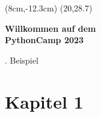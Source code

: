\documentclass[a4paper]{article}
\title{}
\author{}
\date{2023-06-24}
\newcommand{\name}{PythonCamp 2023}
\newcommand{\BeispielCommand}{2. Beispiel}
\begin{document}
	\fancyput(8cm,-12.3cm){%
		\setlength{\unitlength}{1cm}\fancyoval(20,28.7)}

	\begin{figure}
		\vspace*{\dimexpr+1cm-\topmargin-\headsep-\headheight-\baselineskip}%
		\hspace*{\dimexpr-1cm-\evensidemargin-\parindent}%
	\end{figure}
	\vspace*{-1cm}
	
%	
	
	\bigskip
	
	{\centering \bfseries \huge Willkommen auf dem \\ \name \par}

	\bigskip
	{\centering \BeispielCommand \par}

	\bigskip
	\section{Kapitel 1}
	
	\lipsum[1]
\end{document}
